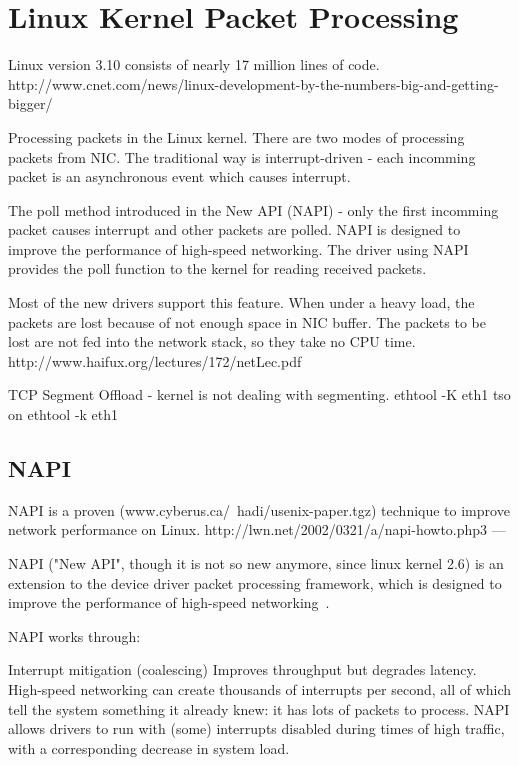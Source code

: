 
\chapter{Linux Kernel Packet Processing}

Linux version 3.10 consists of nearly 17 million lines of code.
http://www.cnet.com/news/linux-development-by-the-numbers-big-and-getting-bigger/

Processing packets in the Linux kernel.
There are two modes of processing packets from NIC.
The traditional way is interrupt-driven - each incomming packet is an
asynchronous event which causes interrupt.

The poll method introduced in the New API (NAPI) - only the first incomming packet causes interrupt
and other packets are polled.
NAPI is designed to improve the performance of high-speed networking.
The driver using NAPI provides the poll function to the kernel for reading received packets.

Most of the new drivers support this feature.
When under a heavy load, the packets are lost because of not enough space in NIC buffer.
The packets to be lost are not fed into the network stack, so they take no CPU time.
http://www.haifux.org/lectures/172/netLec.pdf


TCP Segment Offload - kernel is not dealing with segmenting.
ethtool -K eth1 tso on
ethtool -k eth1


\section{NAPI}

NAPI is a proven (www.cyberus.ca/~hadi/usenix-paper.tgz) technique
to improve network performance on Linux.
http://lwn.net/2002/0321/a/napi-howto.php3
---

NAPI ("New API", though it is not so new anymore, since linux kernel 2.6) is an extension to the device driver packet processing framework, which is designed to improve the performance of high-speed networking~\cite{linux-foundation-napi}.

NAPI works through:

Interrupt mitigation (coalescing)
 Improves throughput but degrades latency.
    High-speed networking can create thousands of interrupts per second, all of which tell the system something it already knew: it has lots of packets to process. NAPI allows drivers to run with (some) interrupts disabled during times of high traffic, with a corresponding decrease in system load.

